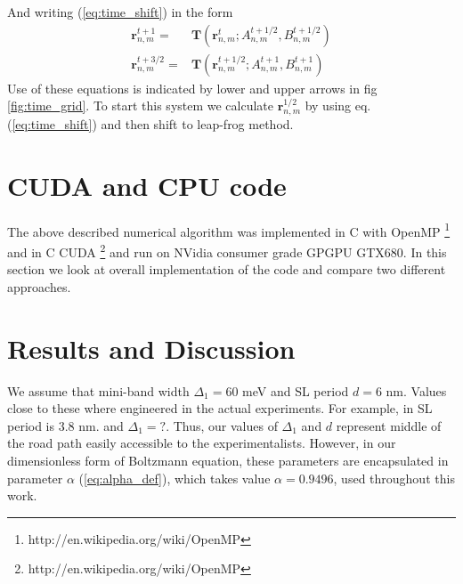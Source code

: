 \documentclass[40pt,letterpaper,physrev]{article}
\begin{document}
	\begin{minipage}{\linewidth}
	\label{fig:time_grid}
	\end{minipage}
	And writing (\ref{eq:time_shift}) in the form
	\begin{align}
		\mathbf{r}^{t+1}_{n,m}=&\mathbf{T}(\mathbf{r}^t_{n,m};A^{t+1/2}_{n,m},B^{t+1/2}_{n,m}) \label{eq:leap_frog_shift_1} \\
		\mathbf{r}^{t+3/2}_{n,m}=&\mathbf{T}(\mathbf{r}^{t+1/2}_{n,m};A^{t+1}_{n,m},B^{t+1}_{n,m}) \label{eq:leap_frog_shift_2}
	\end{align}
	Use of these equations is indicated by lower and upper arrows in fig \ref{fig:time_grid}. To start this system we calculate $\mathbf{r}^{1/2}_{n,m}$ by using eq. (\ref{eq:time_shift}) and then shift to leap-frog method.
    \section{CUDA and CPU code}
    The above described numerical algorithm was implemented in C with 
    OpenMP \footnote{http://en.wikipedia.org/wiki/OpenMP} and in 
    C CUDA \footnote{http://en.wikipedia.org/wiki/OpenMP} and run on NVidia consumer grade GPGPU GTX680. 
    In this section we look at overall implementation of the code and compare two different approaches.
    \section{Results and Discussion}
    We assume that mini-band width $\Delta_1=60$ meV and SL period $d=6$ nm. Values close to these where engineered
    in the actual experiments. For example, in \cite{PhysRevB.56.10303} SL period is $3.8$ nm. and $\Delta_1=?$. 
    Thus, our values of $\Delta_1$ and $d$ represent middle of the road path easily accessible to the
    experimentalists. However, in our dimensionless form of Boltzmann equation, these parameters are encapsulated
    in parameter $\alpha$ (\ref{eq:alpha_def}), which takes value $\alpha=0.9496$, used throughout this work. 
    
\end{document}
